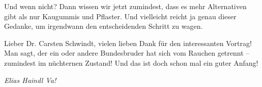 \begin{multicols}{2}
Und wenn nicht? Dann wissen wir jetzt
zumindest, dass es mehr Alternativen gibt als nur Kaugummis und Pflaster. Und
vielleicht reicht ja genau dieser Gedanke, um irgendwann den entscheidenden
Schritt zu wagen.

Lieber Dr. Carsten Schwindt, vielen lieben
Dank für den interessanten Vortrag! Man sagt, der ein oder andere Bundesbruder
hat sich vom Rauchen getrennt – zumindest im nüchternen Zustand! Und das ist
doch schon mal ein guter Anfang!

	\begin{flushright}
		\hfill\emph{Elias Haindl Va!}
	\end{flushright}


\end{multicols}

